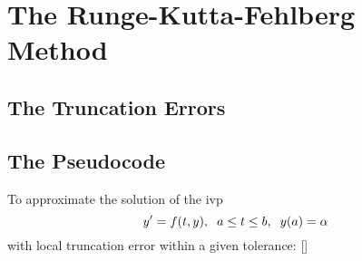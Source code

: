 \documentclass[12pt,oneside]{book}
\begin{document}
		\clearpage
	\section{The Runge-Kutta-Fehlberg Method} \label{m:rkf}
		\begin{spacing}{1.2}
			
			
			
			\subsection*{The Truncation Errors}
			
			
			\subsection*{The Pseudocode} 
				To approximate the solution of the \ac{ivp} 
				\[ y' = f(t,y), \hspace*{0.2cm} a \leq t \leq b, \hspace*{0.2cm} y(a) = \alpha \]
				with local truncation error within a given tolerance: []
				

\end{spacing}
\end{document}
